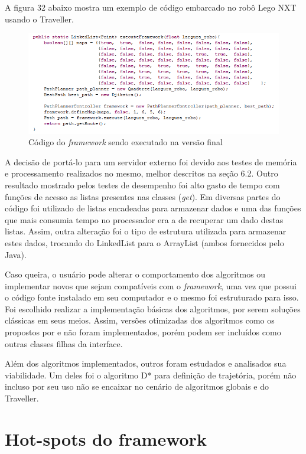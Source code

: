 A figura 32 abaixo mostra um exemplo de código embarcado no robô Lego NXT usando o Traveller.

\begin{figure}[h]
	\centering
	\label{fig32}
		\includegraphics[keepaspectratio=true,scale=0.8]{figuras/codigofinal.PNG}
	\caption{Código do \textit{framework} sendo executado na versão final}
\end{figure}

A decisão de portá-lo para um servidor externo foi devido aos testes de memória e processamento realizados no mesmo, melhor descritos na seção 6.2. Outro resultado mostrado pelos testes de desempenho foi alto gasto de tempo com funções de acesso as listas presentes nas classes (\textit{get}). Em diversas partes do código foi utilizado de listas encadeadas para armazenar dados e uma das funções que mais consumia tempo no processador era a de recuperar um dado destas listas. Assim, outra alteração foi o tipo de estrutura utilizada para armazenar estes dados, trocando do LinkedList para o ArrayList (ambos fornecidos pelo Java).

Caso queira, o usuário pode alterar o comportamento dos algoritmos ou implementar novos que sejam compatíveis com o \textit{framework}, uma vez que possui o código fonte instalado em seu computador e o mesmo foi estruturado para isso. Foi escolhido realizar a implementação básicas dos algoritmos, por serem soluções clássicas em seus meios. Assim, versões otimizadas dos algoritmos como os propostos por \cite{Souza2008} e \cite{Medeiros2011} não foram implementados, porém podem ser incluídos como outras classes filhas da interface.

Além dos algoritmos implementados, outros foram estudados e analisados sua viabilidade. Um deles foi o algoritmo D* \cite{Ferguson__2005_5119} para definição de trajetória, porém não incluso por seu uso não se encaixar no cenário de algoritmos globais e do Traveller.

\section{Hot-spots do framework}

